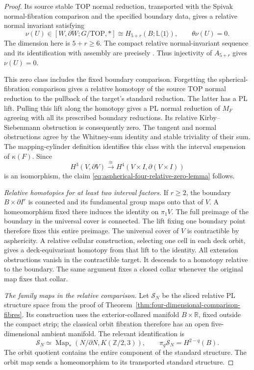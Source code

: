 \begin{proof}
Its source stable TOP normal reduction, transported
with the Spivak normal-fibration comparison and the
specified boundary data, gives a relative normal
invariant satisfying
\begin{equation}\label{eq:aspherical-four-normal-invariant}
 \nu(U)\in[W,\partial W;G/\mathrm{TOP},*]
       \cong H_{5+r}(B;\mathbb L\langle1\rangle),
 \qquad \theta\nu(U)=0.
\end{equation}
The dimension here is $5+r\geq6$.  The compact relative
normal-invariant sequence and its identification with
assembly are precisely
\cite[Definition~18.2, pp.~197--198; relative-version
paragraph on p.~198; Proposition~18.3 and Theorem~18.5,
pp.~198--201]{Ranicki1992TopologicalManifolds}.
Thus injectivity of $A_{5+r}$ gives $\nu(U)=0$.

This zero class includes the fixed boundary comparison.
Forgetting the spherical-fibration comparison gives a
relative homotopy of the source TOP normal reduction
to the pullback of the target's standard reduction.
The latter has a PL lift.  Pulling this lift along the
homotopy gives a PL normal reduction of $M_F$ agreeing
with all its prescribed boundary reductions.  Its
relative Kirby--Siebenmann obstruction is consequently
zero.  The tangent and normal obstructions agree by
the Whitney-sum identity and stable triviality of their
sum.  The mapping-cylinder definition identifies this
class with the interval suspension of $\kappa(F)$.
Since
\[
 H^3(V,\partial V)\xrightarrow{\ \cong\ }
 H^4(V\times I,\partial(V\times I))
\]
is an isomorphism, the claim
\eqref{eq:aspherical-four-relative-zero-lemma} follows.

\emph{Relative homotopies for at least two interval factors.}
If $r\geq2$, the boundary $B\times\partial I^r$ is
connected and its fundamental group maps onto that
of $V$.  A homeomorphism fixed there induces the
identity on $\pi_1V$.  The full preimage of the boundary
in the universal cover is connected.  The lift fixing
one boundary point therefore fixes this entire preimage.
The universal cover of $V$ is contractible by asphericity.
A relative cellular construction, selecting one cell
in each deck orbit, gives a deck-equivariant homotopy
from that lift to the identity.  All extension
obstructions vanish in the contractible target.
It descends to a homotopy relative to the boundary.
The same argument fixes a closed collar whenever the
original map fixes that collar.

\emph{The family maps in the relative comparison.}
Let $\mathcal S_N$ be the sliced relative PL structure
space from the proof of
Theorem~\ref{thm:four-dimensional-comparison-fibres}.
Its construction uses the exterior-collared manifold
$B\times\mathbb R$, fixed outside the compact strip;
the classical orbit fibration therefore has an open
five-dimensional ambient manifold.  The relevant
identification is
\begin{equation}\label{eq:aspherical-four-structure-space}
 \mathcal S_N\simeq
 \operatorname{Map}_*(N/\partial N,K(\mathbb Z/2,3)),
 \qquad \pi_q\mathcal S_N=H^{2-q}(B).
\end{equation}
The orbit quotient contains the entire component of
the standard structure.  The orbit map sends a
homeomorphism to its transported standard structure.


\end{proof}

